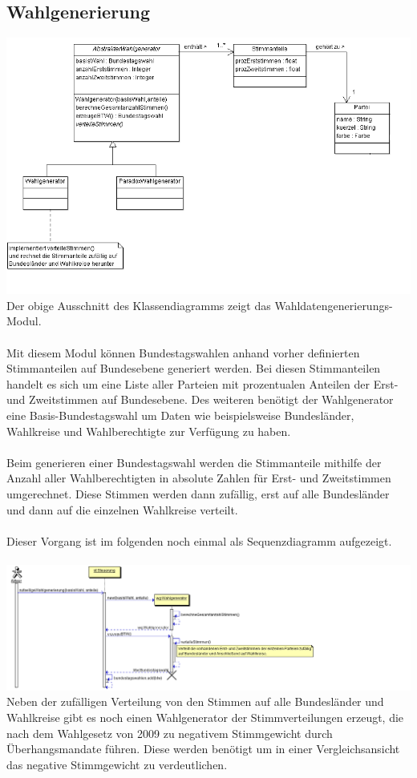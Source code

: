 \documentclass[10pt,a4paper]{article}
\begin{document}
\subsection{Wahlgenerierung}
\includegraphics[scale=0.5]{Wahlgenerator_Klassendiagramm.png} \\
Der obige Ausschnitt des Klassendiagramms zeigt das Wahldatengenerierungs-Modul.\\\\
Mit diesem Modul können Bundestagswahlen anhand vorher definierten Stimmanteilen auf Bundesebene generiert werden. Bei diesen Stimmanteilen handelt es sich um eine Liste aller Parteien mit prozentualen Anteilen der Erst- und Zweitstimmen auf Bundesebene. Des weiteren benötigt der Wahlgenerator eine Basis-Bundestagswahl um Daten wie beispielsweise Bundesländer, Wahlkreise und Wahlberechtigte zur Verfügung zu haben.\\\\
Beim generieren einer Bundestagswahl werden die Stimmanteile mithilfe der Anzahl aller Wahlberechtigten in absolute Zahlen für Erst- und Zweitstimmen umgerechnet. Diese Stimmen werden dann zufällig, erst auf alle Bundesländer und dann auf die einzelnen Wahlkreise verteilt.\\\\
Dieser Vorgang ist im folgenden noch einmal als Sequenzdiagramm aufgezeigt.\\\\
\includegraphics[scale=0.5]{zufaelligeWahlgenerierung_Sequenzdiagramm.png}
Neben der zufälligen Verteilung von den Stimmen auf alle Bundesländer und Wahlkreise gibt es noch einen Wahlgenerator der Stimmverteilungen erzeugt, die nach dem Wahlgesetz von 2009 zu negativem Stimmgewicht durch Überhangsmandate führen. Diese werden benötigt um in einer Vergleichsansicht das negative Stimmgewicht zu verdeutlichen.
\end{document}

